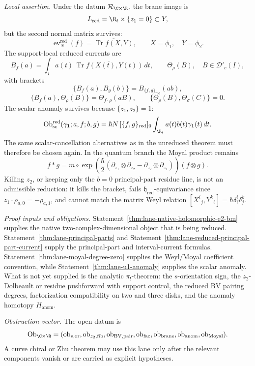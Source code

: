\begin{stmt}
  \emph{Local assertion.} Under the datum
  \(\mathcal R_{\C\times\R}\), the brane image is
  \[
    L_{\mathrm{red}}=\R_t\times\{z_1=0\}\subset Y,
  \]
  but the second normal matrix survives:
  \[
    \operatorname{ev}^{\mathrm{red}}_N(f)
    =
    \overline{\operatorname{Tr}f(X,Y)},\qquad
    X=\phi_1,\quad Y=\phi_2.
  \]
  The support-local reduced currents are
  \[
    B_f(a)=\int_I a(t)\,
    \overline{\operatorname{Tr}f(X(t),Y(t))}\,dt,
    \qquad
    \Theta_\rho(B),\quad B\in\mathcal D'_c(I),
  \]
  with brackets
  \[
    \{B_f(a),B_g(b)\}
      =B_{\{f,g\}_{\mathrm{red}}}(ab),
  \]
  \[
    \{B_f(a),\Theta_\rho(B)\}
      =
      \Theta_{f\cdot\rho}(aB),
    \qquad
    \{\Theta_\rho(B),\Theta_\sigma(C)\}=0 .
  \]
  The scalar anomaly survives because \(\{z_1,z_2\}=1\):
  \[
    \operatorname{Ob}^{\mathrm{red}}_{\mathrm{sc}}
    (\gamma_{\mathbf1};a,f;b,g)
    =
    \hbar N\, [\{f,g\}_{\mathrm{red}}]_0
    \int_{\R_t}a(t)b(t)\gamma_{\mathbf1}(t)\,dt .
  \]
  The same scalar-cancellation alternatives as in the unreduced theorem
  must therefore be chosen again.  In the quantum branch the Moyal
  product remains
  \[
    f*g
    =
    m\circ\exp\!\left(
      \frac{\hbar}{2}
      (\partial_{z_1}\otimes\partial_{z_2}
      -\partial_{z_2}\otimes\partial_{z_1})
    \right)(f\otimes g).
  \]
  Killing \(z_2\), or keeping only the \(b=0\) principal-part residue
  line, is not an admissible reduction: it kills the bracket, fails
  \(\mathfrak h_{\mathrm{red}}\)-equivariance since
  \(z_1\cdot\rho_{a,0}=-\rho_{a,1}\), and cannot match the matrix Weyl
  relation \([X^i{}_j,Y^k{}_\ell]=\hbar\delta^i_\ell\delta^k_j\).

  \emph{Proof inputs and obligations.}
  Statement~\ref{thm:lane-native-holomorphic-e2-bm} supplies the native
  two-complex-dimensional object that is being reduced.
  Statement~\ref{thm:lane-principal-parts} and
  Statement~\ref{thm:lane-reduced-principal-part-current} supply the
  principal-part and interval-current formulas.
  Statement~\ref{thm:lane-moyal-degree-zero} supplies the Weyl/Moyal
  coefficient convention, while Statement~\ref{thm:lane-u1-anomaly}
  supplies the scalar anomaly.  What is not yet supplied is the analytic
  \(\pi_!\)-theorem: the \(s\)-orientation sign, the \(z_2\)-Dolbeault
  or residue pushforward with support control, the reduced BV pairing
  degrees, factorization compatibility on two and three disks, and the
  anomaly homotopy \(H_{\mathrm{anom}}\).

  \emph{Obstruction vector.} The open datum is
  \[
    \operatorname{Ob}_{\C\times\R}
    =
    (\operatorname{ob}_{s,\mathrm{or}},
     \operatorname{ob}_{z_2,\mathrm{fib}},
     \operatorname{ob}_{\mathrm{BV,pair}},
     \operatorname{ob}_{\mathrm{fac}},
     \operatorname{ob}_{\mathrm{brane}},
     \operatorname{ob}_{\mathrm{anom}},
     \operatorname{ob}_{\mathrm{Moyal}}).
  \]
  A curve chiral or Zhu theorem may use this lane only after the relevant
  components vanish or are carried as explicit hypotheses.
\end{stmt}

